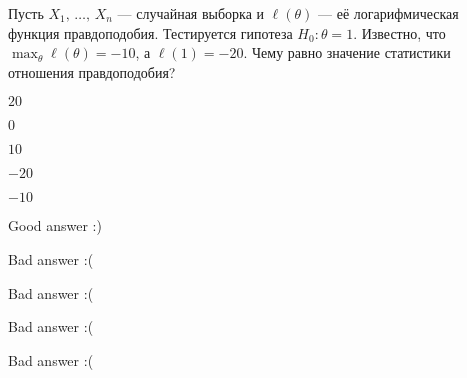 
\begin{question}
Пусть \(X_1, \, \ldots, \, X_n\) --- случайная выборка и
\(\ell(\theta)\) --- её логарифмическая функция правдоподобия.
Тестируется гипотеза \(H_0: \theta = 1\). Известно, что
\(\max_{\theta}\ell(\theta) = -10\), а \(\ell(1) = -20\). Чему равно
значение статистики отношения правдоподобия?
\begin{answerlist}
  \item \(20\)
  \item \(0\)
  \item \(10\)
  \item \(-20\)
  \item \(-10\)
\end{answerlist}
\end{question}

\begin{solution}
\begin{answerlist}
  \item Good answer :)
  \item Bad answer :(
  \item Bad answer :(
  \item Bad answer :(
  \item Bad answer :(
\end{answerlist}
\end{solution}

